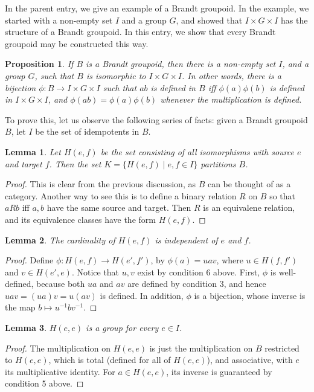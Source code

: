 \documentclass[12pt]{article}
\newtheorem{prop}{Proposition}
\newtheorem{lem}{Lemma}
\begin{document}
In the parent entry, we give an example of a Brandt groupoid.  In the example, we started with a non-empty set $I$ and a group $G$, and showed that $I\times G\times I$ has the structure of a Brandt groupoid.  In this entry, we show that every Brandt groupoid may be constructed this way.

\begin{prop}  If $B$ is a Brandt groupoid, then there is a non-empty set $I$, and a group $G$, such that $B$ is isomorphic to $I\times G\times I$.  In other words, there is a bijection $\phi: B\to I\times G\times I$ such that $ab$ is defined in $B$ iff $\phi(a)\phi(b)$ is defined in $I\times G\times I$, and $\phi(ab)=\phi(a)\phi(b)$ whenever the multiplication is defined.
\end{prop}

To prove this, let us observe the following series of facts: given a Brandt groupoid $B$, let $I$ be the set of idempotents in $B$.

\begin{lem}  Let $H(e,f)$ be the set consisting of all isomorphisms with source $e$ and target $f$.  Then the set $K=\lbrace H(e,f)\mid e,f\in I\rbrace$ partitions $B$. \end{lem}
\begin{proof} This is clear from the previous discussion, as $B$ can be thought of as a category.  Another way to see this is to define a binary relation $R$ on $B$ so that $aRb$ iff $a,b$ have the same source and target.  Then $R$ is an equivalene relation, and its equivalence classes have the form $H(e,f)$.  \end{proof}

\begin{lem}  The cardinality of $H(e,f)$ is independent of $e$ and $f$.  \end{lem}
\begin{proof} Define $\phi:H(e,f)\to H(e',f')$, by $\phi(a)=uav$, where $u\in H(f,f')$ and $v\in H(e',e)$.  Notice that $u,v$ exist by condition 6 above.  First, $\phi$ is well-defined, because both $ua$ and $av$ are defined by condition 3, and hence $uav=(ua)v=u(av)$ is defined.  In addition, $\phi$ is a bijection, whose inverse is the map $b\mapsto u^{-1} b v^{-1}$.  \end{proof}

\begin{lem}  $H(e,e)$ is a group for every $e\in I$.  \end{lem}
\begin{proof}  The multiplication on $H(e,e)$ is just the multiplication on $B$ restricted to $H(e,e)$, which is total (defined for all of $H(e,e)$), and associative, with $e$ its multiplicative identity.  For $a\in H(e,e)$, its inverse is guaranteed by condition 5 above.  \end{proof}
\end{document}
